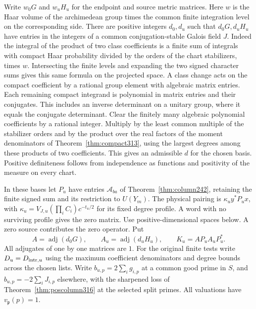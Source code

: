 \documentclass[a4paper,11pt]{article}
\theoremstyle{definition}
\theoremstyle{remark}
\numberwithin{equation}{section}
\begin{document}
Write \(w_0G\) and \(w_u H_u\) for the endpoint and source
metric matrices. Here \(w\) is the Haar volume of the
archimedean group times the common finite integration level
on the corresponding side. There are positive integers
\(d_0,d_u\) such that \(d_0G,d_uH_u\) have entries in the
integers of a common conjugation-stable Galois field \(J\).
Indeed the integral of the product of two class coefficients
is a finite sum of integrals with compact Haar probability
divided by the orders of the chart stabilizers, times \(w\).
Intersecting the finite levels and expanding the two signed
character sums gives this same formula on the projected
space. A class change acts on the compact coefficient by a
rational group element with algebraic matrix entries. Each
remaining compact integrand is polynomial in matrix entries
and their conjugates. This includes an inverse determinant
on a unitary group, where it equals the conjugate determinant.
Clear the finitely many algebraic polynomial coefficients by
a rational integer. Multiply by the least common multiple
of the stabilizer orders and by the product over the real
factors of the moment denominators of
Theorem~\ref{thm:compact313}, using the largest degrees
among these products of two coefficients. This gives an
admissible \(d\) for the chosen basis. Positive definiteness
follows from independence as functions and positivity of
the measure on every chart.

In these bases let \(P_u\) have entries \(\mathcal A_{ba}\)
of Theorem~\ref{thm:column242}, retaining the finite signed
sum and its restriction to \(U(Y_m)\). The physical pairing
is \(\kappa_u y^*P_u x\), with
\(\kappa_u=V_{J,u}(\prod_i C_i)c^{-t_u/2}\) for its fixed
degree profile. A word with no surviving profile gives the
zero matrix. Use positive-dimensional spaces below. A zero
source contributes the zero operator. Put
\[
 A=\operatorname{adj}(d_0G),\qquad
 A_u=\operatorname{adj}(d_u H_u),\qquad
 K_u=A P_u A_u P_u^* .
\]
All adjugates of one by one matrices are \(1\). For the
original finite tests write \(D_u=D_{{\rm intr},u}\) using
the maximum coefficient denominators and degree bounds
across the chosen lists. Write \(b_{u,p}=2\sum_i g_{i,p}\)
at a common good prime in \(S\), and
\(b_{u,p}=-2\sum_i J_{i,p}\) elsewhere, with the sharpened
loss of Theorem~\ref{thm:poscolumn316} at the selected split
primes. All valuations have \(v_{\mathfrak p}(p)=1\).
\end{document}
